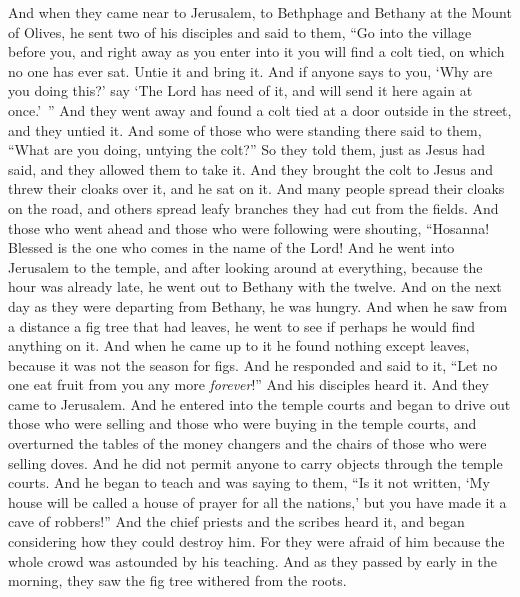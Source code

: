 \begin{biblechapter} %
 And when they came near to Jerusalem, to Bethphage and Bethany at the Mount of Olives, he sent two of his disciples
\verse and said to them, “Go into the village before you, and right away as you enter into it you will find a colt tied, on which no one has ever sat. Untie it and bring it.
\verse And if anyone says to you, ‘Why are you doing this?’ say ‘The Lord has need of it, and will send it here again at once.’ ”
\verse And they went away and found a colt tied at a door outside in the street, and they untied it.
\verse And some of those who were standing there said to them, “What are you doing, untying the colt?”
\verse So they told them, just as Jesus had said, and they allowed them to take it.
\verse And they brought the colt to Jesus and threw their cloaks over it, and he sat on it.
\verse And many people spread their cloaks on the road, and others spread leafy branches they had cut from the fields.
\verse And those who went ahead and those who were following were shouting,
\verse “Hosanna! 
Blessed is the one who comes in the name of the Lord!
\verse And he went into Jerusalem to the temple, and after looking around at everything, because the hour was already late, he went out to Bethany with the twelve.
 And on the next day as they were departing from Bethany, he was hungry.
\verse And when he saw from a distance a fig tree that had leaves, he went to see if perhaps he would find anything on it. And when he came up to it he found nothing except leaves, because it was not the season for figs.
\verse And he responded and said to it, “Let no one eat fruit from you any more \textit{forever}!” And his disciples heard it.
 And they came to Jerusalem. And he entered into the temple courts and began to drive out those who were selling and those who were buying in the temple courts, and overturned the tables of the money changers and the chairs of those who were selling doves.
\verse And he did not permit anyone to carry objects through the temple courts.
\verse And he began to teach and was saying to them, “Is it not written, ‘My house will be called a house of prayer 
for all the nations,’
\verse but you have made it a cave of robbers!”
\verse And the chief priests and the scribes heard it, and began considering how they could destroy him. For they were afraid of him because the whole crowd was astounded by his teaching.
 And as they passed by early in the morning, they saw the fig tree withered from the roots.

\end{biblechapter}
